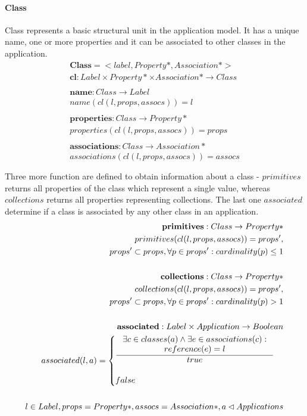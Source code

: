 \documentclass[11pt]{article}
\begin{document}
\paragraph{Class} Class represents a basic structural unit in the application model. It has a unique name, one or more properties and it can be associated to other classes in the application. 
\begin{align*}
	\mathbf{Class} = <label, Property*, Association*> \\
	\mathbf{cl} : Label \times Property* \times Association* \rightarrow Class \\\\
	\mathbf{name} : Class \rightarrow Label \\
	name(cl(l, props, assocs)) = l \\ \\
	\mathbf{properties} : Class \rightarrow Property* \\
	properties(cl(l, props, assocs)) = props \\ \\
	\mathbf{associations} : Class \rightarrow Association* \\	associations(cl(l, props, assocs)) = assocs \\ \\
\end{align*}
Three more function are defined to obtain information about a class - $primitives$ returns all properties of the class which represent a single value, whereas $collections$ returns all properties representing collections. The last one $associated$ determine if a class is associated by any other class in an application.
\begin{align*}
	\mathbf{primitives} : Class \rightarrow Property* \\	primitives(cl(l, props, assocs)) = props', \\ props' \subset props,  \forall p \in props' : cardinality(p) \leq 1 \\ \\
	\mathbf{collections} : Class \rightarrow Property* \\	collections(cl(l, props, assocs)) = props', \\ props' \subset props, \forall p \in props' : cardinality(p) > 1 \\ \\
	\mathbf{associated} :  Label \times Application \rightarrow Boolean \\
  	associated(l,a) = \begin{cases}
  		\inference{\exists c \in classes(a) \wedge \exists e \in associations(c) : \\ reference(e) = l
  	}{ true } \\\\
 		false
 	\end{cases} \\ \\
	l \in Label, props = Property*, assocs = Association*,a \lhd Applications
\end{align*}
	 
\end{document}
